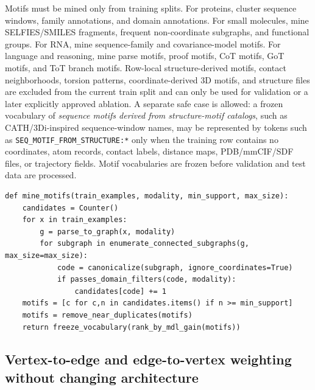 \documentclass[11pt]{article}
\newcommand{\1}{\mathbf{1}}
\begin{document}
Motifs must be mined only from training splits. For proteins, cluster sequence windows, family annotations, and domain annotations. For small molecules, mine SELFIES/SMILES fragments, frequent non-coordinate subgraphs, and functional groups. For RNA, mine sequence-family and covariance-model motifs. For language and reasoning, mine parse motifs, proof motifs, CoT motifs, GoT motifs, and ToT branch motifs. Row-local structure-derived motifs, contact neighborhoods, torsion patterns, coordinate-derived 3D motifs, and structure files are excluded from the current train split and can only be used for validation or a later explicitly approved ablation. A separate safe case is allowed: a frozen vocabulary of \emph{sequence motifs derived from structure-motif catalogs}, such as CATH/3Di-inspired sequence-window names, may be represented by tokens such as \texttt{SEQ\_MOTIF\_FROM\_STRUCTURE:*} only when the training row contains no coordinates, atom records, contact labels, distance maps, PDB/mmCIF/SDF files, or trajectory fields. Motif vocabularies are frozen before validation and test data are processed.

\begin{lstlisting}[caption={Leakage-safe motif mining.}]
def mine_motifs(train_examples, modality, min_support, max_size):
    candidates = Counter()
    for x in train_examples:
        g = parse_to_graph(x, modality)
        for subgraph in enumerate_connected_subgraphs(g, max_size=max_size):
            code = canonicalize(subgraph, ignore_coordinates=True)
            if passes_domain_filters(code, modality):
                candidates[code] += 1
    motifs = [c for c,n in candidates.items() if n >= min_support]
    motifs = remove_near_duplicates(motifs)
    return freeze_vocabulary(rank_by_mdl_gain(motifs))
\end{lstlisting}

\subsection{Vertex-to-edge and edge-to-vertex weighting without changing architecture}
\end{document}
